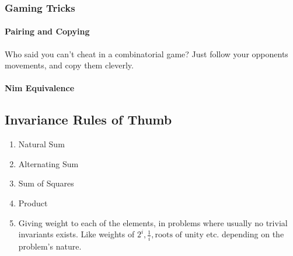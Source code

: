 		\subsubsection{Gaming Tricks}


			\paragraph{Pairing and Copying}

			{Who said you can't cheat in a combinatorial game? Just follow your opponents movements, and copy them cleverly.}


			\begin{enumerate}[wide=0em, label=\arabic*, itemsep=0pt, parsep=0pt, font=\footnotesize\bfseries]


			\end{enumerate}


			\paragraph{Nim Equivalence}





	\subsection{Invariance Rules of Thumb}\label{invariant_rules_of_thumb}

		\begin{enumerate}[wide=0em, label=\arabic*, itemsep=0pt, parsep=0pt, font=\footnotesize\bfseries]

			\item Natural Sum
			\item Alternating Sum
			\item Sum of Squares
			\item Product

			\item Giving weight to each of the elements, in problems where usually no trivial invariants exists. Like weights of $ 2^i, \frac{1}{i}, \text{roots of unity} $ etc. depending on the problem's nature.
		\end{enumerate}

